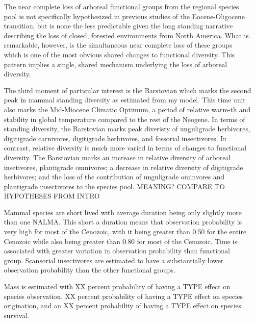 \documentclass[12pt,letterpaper]{article}
\begin{document}
The near complete loss of arboreal functional groups from the regional species pool is not specifically hypothesized in previous studies of the Eocene-Oligocene transition, but is none the less predictable given the long standing narrative describing the loss of closed, forested environments from North America. What is remarkable, however, is the simultaneous near complete loss of these groups which is one of the most obvious shared changes to functional diversity. This pattern implies a single, shared mechanism underlying the loss of arboreal diversity.




The third moment of particular interest is the Barstovian which marks the second peak in mammal standing diversity as estimated from my model. This time unit also marks the Mid-Miocene Climatic Optimum, a period of relative warm-th and stability in global temperature compared to the rest of the Neogene. In terms of standing diversity, the Barstovian marks peak diveristy of unguligrade herbivores, digitigrade carnivores, digitigrade herbivores, and fossorial insectivores. In contrast, relative diversity is much more varied in terms of changes to functional diversity. The Barstovian marks an increase in relative diversity of arboreal insetivores, plantigrade omnivores; a decrease in relative diversity of digitigrade herbivores; and the loss of the contribution of unguligrade ominvores and plantigrade insectivores to the species pool. \uppercase{meaning? compare to hypotheses from intro}



Mammal species are short lived with average duration being only slightly more than one NALMA. This short a duration means that observation probability is very high for most of the Cenozoic, with it being greater than 0.50 for the entire Cenozoic while also being greater than 0.80 for most of the Cenozoic. Time is associated with greater variation in observation probability than functional group. Scansorial insectivores are estimated to have a substantially lower observation probability than the other functional groups.

Mass is estimated with XX percent probability of having a TYPE effect on species observation, XX percent probability of having a TYPE effect on species origination, and an XX percent probability of having a TYPE effect on species survival.
\end{document}

